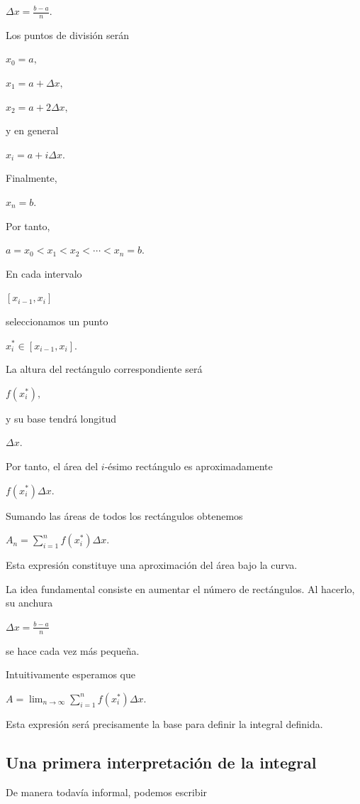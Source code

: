 \documentclass[12pt]{article}
\begin{document}
$
\Delta x=\frac{b-a}{n}.
$

Los puntos de división serán

$
x_0=a,
$

$
x_1=a+\Delta x,
$

$
x_2=a+2\Delta x,
$

y en general

$
x_i=a+i\Delta x.
$

Finalmente,

$
x_n=b.
$

Por tanto,

$
a=x_0<x_1<x_2<\cdots<x_n=b.
$

En cada intervalo

$
[x_{i-1},x_i]
$

seleccionamos un punto

$
x_i^*\in[x_{i-1},x_i].
$

La altura del rectángulo correspondiente será

$
f(x_i^*),
$

y su base tendrá longitud

$
\Delta x.
$

Por tanto, el área del $i$-ésimo rectángulo es aproximadamente

$
f(x_i^*)\Delta x.
$

Sumando las áreas de todos los rectángulos obtenemos

$
A_n
=
\sum_{i=1}^{n}
f(x_i^*)\Delta x.
$

Esta expresión constituye una aproximación del área bajo la curva.

La idea fundamental consiste en aumentar el número de rectángulos.
Al hacerlo, su anchura

$
\Delta x=\frac{b-a}{n}
$

se hace cada vez más pequeña.

Intuitivamente esperamos que

$
A
=
\lim_{n\to\infty}
\sum_{i=1}^{n}
f(x_i^*)\Delta x.
$

Esta expresión será precisamente la base para definir la integral
definida.

\subsection*{Una primera interpretación de la integral}

De manera todavía informal, podemos escribir
\end{document}
